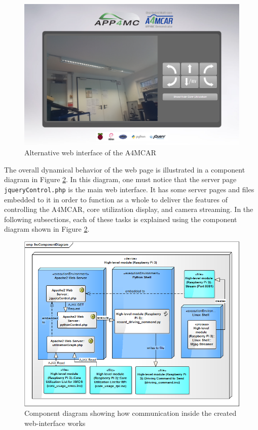 \begin{figure}[!ht]
	\centering
	\captionsetup{justification=centering}
	\includegraphics[width=\textwidth]{content/images/web2.png}
	\caption{Alternative web interface of the A4MCAR}
	\label{fig:web2}
\end{figure}

The overall dynamical behavior of the web page is illustrated in a component diagram in Figure \ref{fig:weboverallbehavior}. In this diagram, one must notice that the server page \texttt{jqueryControl.php} is the main web interface. It has some server pages and files embedded to it in order to function as a whole to deliver the features of controlling the A4MCAR, core utilization display, and camera streaming. In the following subsections, each of these tasks is explained using the component diagram shown in Figure \ref{fig:weboverallbehavior}.

\begin{figure}[!ht]
	\centering
	\captionsetup{justification=centering}
	\includegraphics[width=\textwidth]{content/images/weboverallbehavior.png}
	\caption{Component diagram showing how communication inside the created web-interface works}
	\label{fig:weboverallbehavior}
\end{figure}

